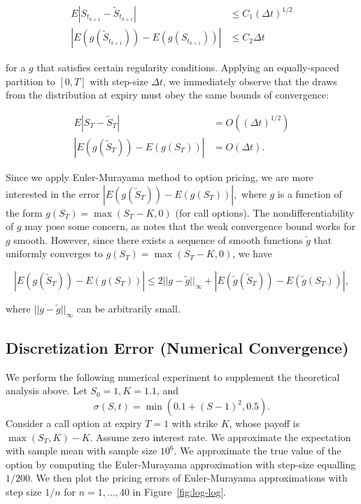 \documentclass[11pt]{article}
\numberwithin{equation}{section}
\newcommand{\abs}[1]{\left|#1\right|}
\newcommand{\norm}[1]{||#1||}
\newcommand{\pr}[1]{\left(#1\right)}
\begin{document}
\begin{align}
E\abs{S_{t_{k+1}} - \tilde S_{t_{k+1}}} &\le C_1(\Delta t)^{1/2}
\tag{Strong convergence} \\ 
\abs{E(g(\tilde S_{t_{k+1}})) - E (g(S_{t_{k+1}}))} &\le C_2
\Delta t \tag{Weak convergence}
\end{align}

for a $g$ that satisfies certain regularity conditions. 
Applying an equally-spaced partition to $[0,T]$ with step-size $\Delta t$, we
immediately observe that the draws from the distribution at expiry must obey the
same bounds of convergence:

\begin{align*}
E\abs{S_{T} - \tilde S_{T}} &= O\pr{(\Delta t)^{1/2}} \\
\abs{E(g(\tilde S_{{T}})) - E (g(S_{T}))} &= O(\Delta t).
\end{align*}

Since we apply Euler-Murayama method to option pricing, we are more interested
in the error $\abs{E(g(\tilde S_T)) - E(g(S_T))},$ where $g$ is a function of
the form $g(S_T) = \max(S_T - K, 0)$ (for call options). The
nondifferentiability of $g$ may pose some concern, as
\cite{higham2001algorithmic} notes that the weak convergence bound works for $g$
smooth. However, since there exists a sequence of smooth functions $\tilde g$
that uniformly converges to $g(S_T) = \max(S_T - K, 0)$, we have 

\[
\abs{E(g(\tilde S_T)) - E(g(S_T))} \le 2\norm{g-\tilde g}_\infty + \abs{E(\tilde
g(\tilde S_{{T}})) - E (\tilde g(S_{T}))},
\]

where $\norm{g-\tilde g}_\infty$ can be arbitrarily small. 

\subsection{Discretization Error (Numerical Convergence)}

We perform the following numerical experiment to supplement the theoretical
analysis above. Let $S_0 = 1, K = 1.1$, and \[\sigma(S, t) = \min\pr{0.1 + (S -
1)^2, 0.5}.\] Consider a call option at expiry $T = 1$ with strike $K$, whose
payoff is $\max(S_T, K) - K$. Assume zero interest rate. We approximate the
expectation with sample mean with sample size $10^6$. We approximate the true
value of the option by computing the Euler-Murayama approximation with step-size
equalling $1/200$. We then plot the pricing errors of Euler-Murayama
approximations with step size $1/n$ for $n=1,\ldots,40$ in
Figure~\ref{fig:log-log}. 
\end{document}
